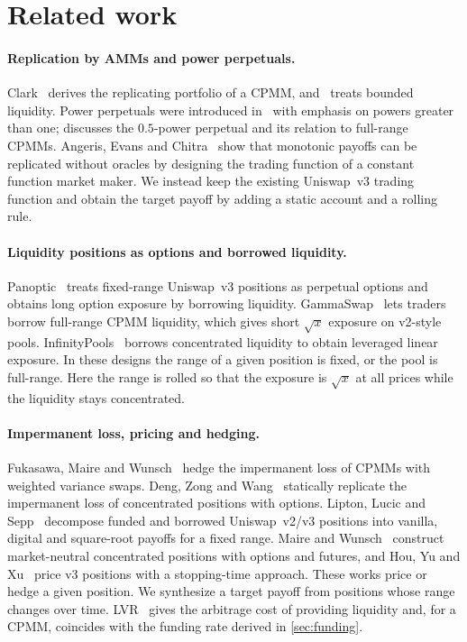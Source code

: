 \documentclass[11pt]{article}
\theoremstyle{definition}
\theoremstyle{remark}
\begin{document}
\section{Related work}\label{sec:related}

\paragraph{Replication by AMMs and power perpetuals.}
Clark~\cite{clark2020replicating} derives the replicating portfolio of a CPMM, and~\cite{clark2021bounded} treats bounded liquidity. Power perpetuals were introduced in~\cite{white2021power} with emphasis on powers greater than one; \cite{robinson2024perp} discusses the $0.5$-power perpetual and its relation to full-range CPMMs. Angeris, Evans and Chitra~\cite{angeris2022monotonic} show that monotonic payoffs can be replicated without oracles by designing the trading function of a constant function market maker. We instead keep the existing Uniswap~v3 trading function and obtain the target payoff by adding a static account and a rolling rule.

\paragraph{Liquidity positions as options and borrowed liquidity.}
Panoptic~\cite{lambert2022panoptic} treats fixed-range Uniswap~v3 positions as perpetual options and obtains long option exposure by borrowing liquidity. GammaSwap~\cite{gammaswap} lets traders borrow full-range CPMM liquidity, which gives short $\sqrt{x}$ exposure on v2-style pools. InfinityPools~\cite{infinitypools} borrows concentrated liquidity to obtain leveraged linear exposure. In these designs the range of a given position is fixed, or the pool is full-range. Here the range is rolled so that the exposure is $\sqrt{x}$ at all prices while the liquidity stays concentrated.

\paragraph{Impermanent loss, pricing and hedging.}
Fukasawa, Maire and Wunsch~\cite{fukasawa2023weighted} hedge the impermanent loss of CPMMs with weighted variance swaps. Deng, Zong and Wang~\cite{deng2023static} statically replicate the impermanent loss of concentrated positions with options. Lipton, Lucic and Sepp~\cite{lipton2024unified} decompose funded and borrowed Uniswap~v2/v3 positions into vanilla, digital and square-root payoffs for a fixed range. Maire and Wunsch~\cite{maire2024market} construct market-neutral concentrated positions with options and futures, and Hou, Yu and Xu~\cite{hou2024risk} price v3 positions with a stopping-time approach. These works price or hedge a given position. We synthesize a target payoff from positions whose range changes over time. LVR~\cite{milionis2022lvr} gives the arbitrage cost of providing liquidity and, for a CPMM, coincides with the funding rate derived in \cref{sec:funding}.
\end{document}
